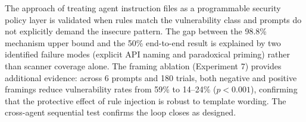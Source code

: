 \documentclass[conference,10pt]{IEEEtran}
\begin{document}
The approach of treating agent instruction files as a programmable security policy layer is validated when rules match the vulnerability class and prompts do not explicitly demand the insecure pattern. The gap between the 98.8\% mechanism upper bound and the 50\% end-to-end result is explained by two identified failure modes (explicit API naming and paradoxical priming) rather than scanner coverage alone. The framing ablation (Experiment 7) provides additional evidence: across 6 prompts and 180 trials, both negative and positive framings reduce vulnerability rates from 59\% to 14--24\% ($p{<}0.001$), confirming that the protective effect of rule injection is robust to template wording. The cross-agent sequential test confirms the loop closes as designed.



\end{document}
